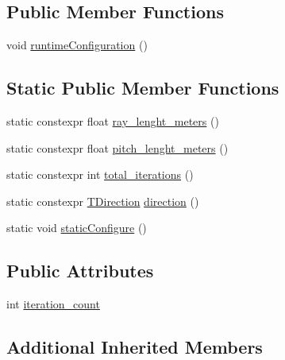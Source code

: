 \subsection*{Public Member Functions}
\begin{DoxyCompactItemize}
\item 
void \hyperlink{structsm__dance__bot__3_1_1SS4_1_1SsFPattern1_aacd95b95139f46ddfd1d10e0194526a7}{runtime\+Configuration} ()
\end{DoxyCompactItemize}
\subsection*{Static Public Member Functions}
\begin{DoxyCompactItemize}
\item 
static constexpr float \hyperlink{structsm__dance__bot__3_1_1SS4_1_1SsFPattern1_a6816dc5311b8804e6dfe26461a3ecc07}{ray\+\_\+lenght\+\_\+meters} ()
\item 
static constexpr float \hyperlink{structsm__dance__bot__3_1_1SS4_1_1SsFPattern1_a1e006c320d916a42156a3be7a77bd764}{pitch\+\_\+lenght\+\_\+meters} ()
\item 
static constexpr int \hyperlink{structsm__dance__bot__3_1_1SS4_1_1SsFPattern1_af20b5bfe906d55c9eeba48a0a3f7598c}{total\+\_\+iterations} ()
\item 
static constexpr \hyperlink{namespacesm__dance__bot__3_1_1f__pattern__states_a83147bb244b48451a16ce27e543c8157}{T\+Direction} \hyperlink{structsm__dance__bot__3_1_1SS4_1_1SsFPattern1_aa289c91e7307df5bd572731611c81efc}{direction} ()
\item 
static void \hyperlink{structsm__dance__bot__3_1_1SS4_1_1SsFPattern1_a0dcfa9e72a7ef7ac0fa97f9f6891ff38}{static\+Configure} ()
\end{DoxyCompactItemize}
\subsection*{Public Attributes}
\begin{DoxyCompactItemize}
\item 
int \hyperlink{structsm__dance__bot__3_1_1SS4_1_1SsFPattern1_a2be72a4340ea2ed40032690d4c88d600}{iteration\+\_\+count}
\end{DoxyCompactItemize}
\subsection*{Additional Inherited Members}


